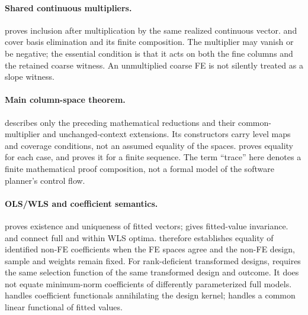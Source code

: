 \paragraph{Shared continuous multipliers.}
 proves inclusion after multiplication by the
same realized continuous vector.  and
 cover basis elimination and its
finite composition. The multiplier may vanish or be negative; the essential
condition is that it acts on both the fine columns and the retained coarse
witness. An unmultiplied coarse FE is not silently treated as a slope witness.

\paragraph{Main column-space theorem.}
 describes only the preceding mathematical reductions
and their common-multiplier and unchanged-context extensions. Its constructors
carry level maps and coverage conditions, not an assumed equality of the
spaces.  proves equality for each case,
and  proves it for a finite sequence.
The term ``trace'' here denotes a finite mathematical proof composition,
not a formal model of the software planner's control flow.

\paragraph{OLS/WLS and coefficient semantics.}
 proves existence and uniqueness of fitted
vectors;  gives fitted-value invariance.
 and
 connect full and within WLS optima.
 therefore establishes equality of
identified non-FE coefficients when the FE spaces agree and the non-FE design,
sample and weights remain fixed.
For rank-deficient transformed designs, 
requires the same selection function of the same transformed design and outcome.
It does not equate minimum-norm coefficients of differently parameterized full
models.  handles coefficient functionals
annihilating the design kernel; 
handles a common linear functional of fitted values.

